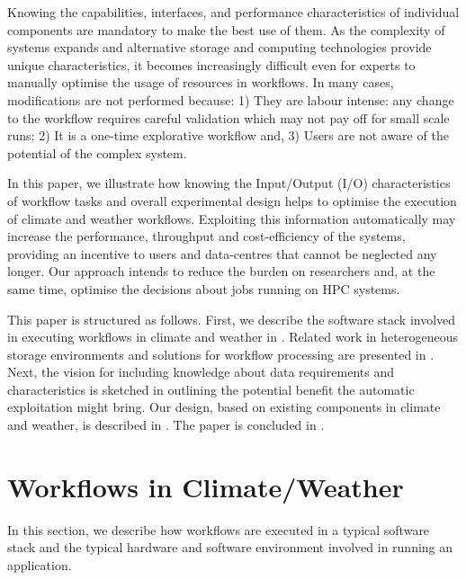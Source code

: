 \documentclass{superfri}
\begin{document}

Knowing the capabilities, interfaces, and performance characteristics of individual components are mandatory to make the best use of them.
As the complexity of systems expands and alternative storage and computing technologies provide unique characteristics, it becomes increasingly difficult even for experts to manually optimise the usage of resources in workflows. In many cases, modifications are not performed because: 1) They are labour intense: any change to the workflow requires careful validation which may not pay off for small scale runs; 2) It is a one-time explorative workflow and, 3) Users are not aware of the potential of the complex system.

In this paper, we illustrate how knowing the Input/Output (I/O) characteristics of workflow tasks and overall experimental design helps to optimise the execution of climate and weather workflows.
Exploiting this information automatically may increase the performance, throughput and cost-efficiency of the systems, providing an incentive to users and data-centres that cannot be neglected any longer.
Our approach intends to reduce the burden on researchers and, at the same time, optimise the decisions about jobs running on HPC systems.

This paper is structured as follows.
First, we describe the software stack involved in executing workflows in climate and weather in .
Related work in heterogeneous storage environments and solutions for workflow processing are presented in .
Next, the vision for including knowledge about data requirements and characteristics is sketched in  outlining the potential benefit the automatic exploitation might bring.
Our design, based on existing components in climate and weather, is described in .
The paper is concluded in .

\section{Workflows in Climate/Weather}
\label{sec:workflows}

In this section, we describe how workflows are executed in a typical software stack and the typical hardware and software environment involved in running an application.
\end{document}
